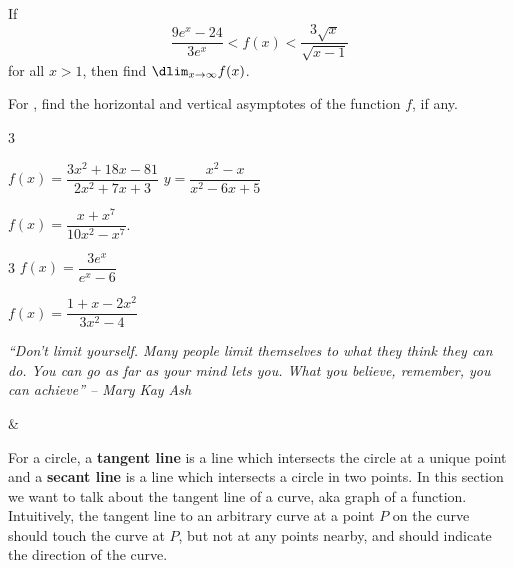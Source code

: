 \documentclass{book}
\begin{document}
\begin{enumerate}[!HW!]
\itemspade If 
\[\dfrac{9e^x-24}{3e^x} < f(x) < \dfrac{3\sqrt{x}}{\sqrt{x-1}}\] for all $x> 1$, then find $\dlim_{x\to\infty} f(x)$. 
\end{enumerate}

For , find the horizontal and vertical asymptotes of the function $f$, if any.
\begin{enumerate}[!HW!]
\begin{multicols}{3}
\item \label{exer:asymptotes:start} $f(x) = \dfrac{3x^2+18x-81}{2x^2+7x+3}$ 
\itemspade $y=\dfrac{x^2-x}{x^2-6x+5}$ 
\item  $f(x) = \dfrac{x+x^7}{10x^2-x^7}$. 
\end{multicols}
\begin{multicols}{3}
\itemspade  $f(x) = \dfrac{3e^x}{e^x-6}$ 
\item\label{exer:asymptotes:stop} $f(x) = \dfrac{1+x-2x^2}{3x^2-4}$ 
\end{multicols}
\end{enumerate}
\pagebreak

\begin{center} 
\emph{``Don't limit yourself. Many people limit themselves to what they think they can do. You can go as far as your mind lets you. What you believe, remember, you can achieve'' -- Mary Kay Ash}
\end{center}

\begin{Videos}
 &
\end{Videos}

For a circle, a \textbf{tangent line} is a line which intersects the circle at a unique point and a \textbf{secant line} is a line which intersects a circle in two points. In this section we want to talk about the tangent line of a curve, aka graph of a function. Intuitively, the tangent line to an arbitrary curve at a point $P$ on the curve should touch the curve at $P$, but not at any points nearby, and should indicate the direction of the curve. \\
\end{document}
